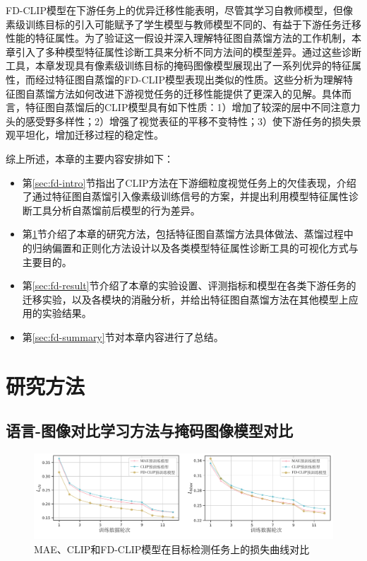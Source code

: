 FD-CLIP模型在下游任务上的优异迁移性能表明，尽管其学习自教师模型，但像素级训练目标的引入可能赋予了学生模型与教师模型不同的、有益于下游任务迁移性能的特征属性\cite{xie2023revealing}。为了验证这一假设并深入理解特征图自蒸馏方法的工作机制，本章引入了多种模型特征属性诊断工具来分析不同方法间的模型差异。通过这些诊断工具，本章发现具有像素级训练目标的掩码图像模型展现出了一系列优异的特征属性，而经过特征图自蒸馏的FD-CLIP模型表现出类似的性质。这些分析为理解特征图自蒸馏方法如何改进下游视觉任务的迁移性能提供了更深入的见解。具体而言，特征图自蒸馏后的CLIP模型具有如下性质：1）增加了较深的层中不同注意力头的感受野多样性；2）增强了视觉表征的平移不变特性；3）使下游任务的损失景观平坦化，增加迁移过程的稳定性。

综上所述，本章的主要内容安排如下：
\begin{itemize}
    \item 第\ref{sec:fd-intro}节指出了CLIP方法在下游细粒度视觉任务上的欠佳表现，介绍了通过特征图自蒸馏引入像素级训练信号的方案，并提出利用模型特征属性诊断工具分析自蒸馏前后模型的行为差异。
    \item 第\ref{sec:fd-method}节介绍了本章的研究方法，包括特征图自蒸馏方法具体做法、蒸馏过程中的归纳偏置和正则化方法设计以及各类模型特征属性诊断工具的可视化方式与主要目的。
    \item 第\ref{sec:fd-result}节介绍了本章的实验设置、评测指标和模型在各类下游任务的迁移实验，以及各模块的消融分析，并给出特征图自蒸馏方法在其他模型上应用的实验结果。
    \item 第\ref{sec:fd-summary}节对本章内容进行了总结。
\end{itemize}

\section{研究方法}
\label{sec:fd-method}

\subsection{语言-图像对比学习方法与掩码图像模型对比}
\begin{figure}
  \centering
  \includegraphics[width=1.0\linewidth]{figures/fd-coco-abl.pdf}
  \caption{MAE、CLIP和FD-CLIP模型在目标检测任务上的损失曲线对比}
  \label{fig:fd-coco-abl}
\end{figure}

